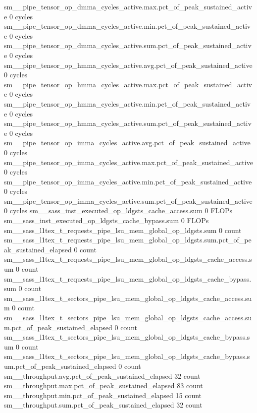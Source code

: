 sm__pipe_tensor_op_dmma_cycles_active.max.pct_of_peak_sustained_active                         0 cycles
sm__pipe_tensor_op_dmma_cycles_active.min.pct_of_peak_sustained_active                         0 cycles
sm__pipe_tensor_op_dmma_cycles_active.sum.pct_of_peak_sustained_active                         0 cycles
sm__pipe_tensor_op_hmma_cycles_active.avg.pct_of_peak_sustained_active                         0 cycles
sm__pipe_tensor_op_hmma_cycles_active.max.pct_of_peak_sustained_active                         0 cycles
sm__pipe_tensor_op_hmma_cycles_active.min.pct_of_peak_sustained_active                         0 cycles
sm__pipe_tensor_op_hmma_cycles_active.sum.pct_of_peak_sustained_active                         0 cycles
sm__pipe_tensor_op_imma_cycles_active.avg.pct_of_peak_sustained_active                         0 cycles
sm__pipe_tensor_op_imma_cycles_active.max.pct_of_peak_sustained_active                         0 cycles
sm__pipe_tensor_op_imma_cycles_active.min.pct_of_peak_sustained_active                         0 cycles
sm__pipe_tensor_op_imma_cycles_active.sum.pct_of_peak_sustained_active                         0 cycles
sm__sass_inst_executed_op_ldgsts_cache_access.sum                                              0 FLOPs
sm__sass_inst_executed_op_ldgsts_cache_bypass.sum                                              0 FLOPs
sm__sass_l1tex_t_requests_pipe_lsu_mem_global_op_ldgsts.sum                                    0 count
sm__sass_l1tex_t_requests_pipe_lsu_mem_global_op_ldgsts.sum.pct_of_peak_sustained_elapsed               0 count
sm__sass_l1tex_t_requests_pipe_lsu_mem_global_op_ldgsts_cache_access.sum                       0 count
sm__sass_l1tex_t_requests_pipe_lsu_mem_global_op_ldgsts_cache_bypass.sum                       0 count
sm__sass_l1tex_t_sectors_pipe_lsu_mem_global_op_ldgsts_cache_access.sum                        0 count
sm__sass_l1tex_t_sectors_pipe_lsu_mem_global_op_ldgsts_cache_access.sum.pct_of_peak_sustained_elapsed               0 count
sm__sass_l1tex_t_sectors_pipe_lsu_mem_global_op_ldgsts_cache_bypass.sum                        0 count
sm__sass_l1tex_t_sectors_pipe_lsu_mem_global_op_ldgsts_cache_bypass.sum.pct_of_peak_sustained_elapsed               0 count
sm__throughput.avg.pct_of_peak_sustained_elapsed                                              32 count
sm__throughput.max.pct_of_peak_sustained_elapsed                                              83 count
sm__throughput.min.pct_of_peak_sustained_elapsed                                              15 count
sm__throughput.sum.pct_of_peak_sustained_elapsed                                              32 count
